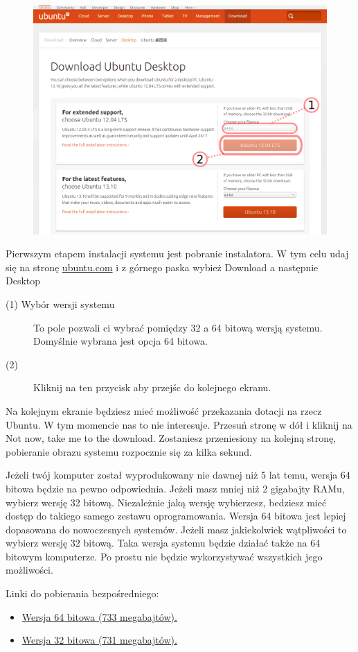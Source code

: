 \begin{figure}
	\includegraphics[scale=0.45]{images/instalacja_pobieranie_obrazu.png}
\end{figure}
Pierwszym etapem instalacji systemu jest pobranie instalatora. W tym celu udaj się na stronę \href{http://www.ubuntu.com/download/desktop}{ubuntu.com} i z górnego paska wybież \textcolor{ubuntu_orange}{Download} a następnie \textcolor{ubuntu_orange}{Desktop}
\begin{description}
\item[(1) Wybór wersji systemu]To pole pozwali ci wybrać pomiędzy 32 a 64 bitową wersją systemu. Domyślnie wybrana jest opcja 64 bitowa. 
\item[(2)]Kliknij na ten przycisk aby przejśc do kolejnego ekranu.
\end{description}
Na kolejnym ekranie będziesz mieć możliwość przekazania dotacji na rzecz Ubuntu. W tym momencie nas to nie interesuje. Przesuń stronę w dół i kliknij na \textcolor{ubuntu_orange}{Not now, take me to the download}. Zostaniesz przeniesiony na kolejną stronę, pobieranie obrazu systemu rozpocznie się za kilka sekund.

Jeżeli twój komputer został wyprodukowany nie dawnej niż 5 lat temu, wersja 64 bitowa będzie na pewno odpowiednia. Jeżeli masz mniej niż 2 gigabajty RAMu, wybierz wersję 32 bitową. Niezależnie jaką wersję wybierzesz, bedziesz mieć dostęp do takiego samego zestawu oprogramowania. Wersja 64 bitowa jest lepiej dopasowana do nowoczesnych systemów. Jeżeli masz jakiekolwiek wątpliwości to wybierz wersję 32 bitową. Taka wersja systemu będzie działać także na 64 bitowym komputerze. Po prostu nie będzie wykorzystywać wszystkich jego możliwości.

Linki do pobierania bezpośredniego:
\begin{itemize}
\item \href{http://www.ubuntu.com/start-download?distro=desktop&bits=64&release=lts}{Wersja 64 bitowa (733 megabajtów).}
\item \href{http://www.ubuntu.com/start-download?distro=desktop&bits=32&release=lts}{Wersja 32 bitowa (731 megabajtów).}
\end{itemize}
\clearpage
